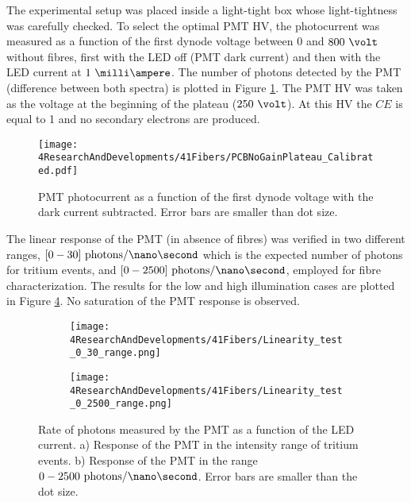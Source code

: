 The experimental setup was placed inside a light-tight box whose light-tightness was carefully checked. To select the optimal PMT HV, the photocurrent was measured as a function of the first dynode voltage between $0$ and $800~\volt$ without fibres, first with the LED off (PMT dark current) and then with the LED current at $1~\milli\ampere$. The number of photons detected by the PMT (difference between both spectra) is plotted in Figure \ref{fig:PlateauNoGainPMT}. The PMT HV was taken as the voltage at the beginning of the plateau ($250~\volt$). At this HV the $CE$ is equal to 1 and no secondary electrons are produced. 
\begin{figure}[h]
\centering
\texttt{[image: 4ResearchAndDevelopments/41Fibers/PCBNoGainPlateau\_Calibrated.pdf]}
\caption{PMT photocurrent as a function of the first dynode voltage with the dark current subtracted. Error bars are smaller than dot size.\label{fig:PlateauNoGainPMT}}
\end{figure}

The linear response of the PMT (in absence of fibres) was verified in two different ranges, $[0-30]~\text{photons}/\nano\second$ which is the expected number of photons for tritium events, and $[0-2500]~\text{photons}/\nano\second$, employed for fibre characterization. The results for the low and high illumination cases are plotted in Figure \ref{fig:LinearityRangesOfPMT}. No saturation of the PMT response is observed.

\begin{figure}
\centering
    \begin{subfigure}[b]{1\textwidth}
    \centering
    \texttt{[image: 4ResearchAndDevelopments/41Fibers/Linearity\_test\_0\_30\_range.png]}  
    \caption{\label{subfig:LinearityTritiumRange}}
    \end{subfigure}
    \hfill
    \begin{subfigure}[b]{1\textwidth}
    \centering
    \texttt{[image: 4ResearchAndDevelopments/41Fibers/Linearity\_test\_0\_2500\_range.png]}  
    \caption{\label{subfig:LinearityStudyRange}}
    \end{subfigure}
 \caption{Rate of photons measured by the PMT as a function of the LED current. a) Response of the PMT in the intensity range of tritium events. b) Response of the PMT in the range $0-2500~\text{photons}/\nano\second$. Error bars are smaller than the dot size.}
 \label{fig:LinearityRangesOfPMT}
\end{figure}
